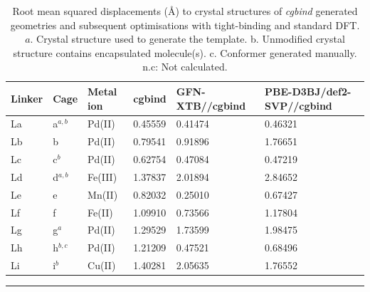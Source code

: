 \documentclass[../../main.tex]{subfiles}
\newcommand{\cgbind}{\emph{cgbind }}
\begin{document}
\begin{table}[h!]
	\def\arraystretch{1.5}
	\begin{tabularx}{\textwidth}{YYYYYY}
		\hline
		Linker&	Cage&	Metal ion&	cgbind&	GFN-XTB//cgbind&PBE-D3BJ/def2-SVP//cgbind\\
		\hline
		La	&a$^{a,b}$&	Pd(II)&	0.45559	&0.41474	&0.46321
\\
		Lb	&b			&	Pd(II)&	0.79541	&0.91896	&1.76651
\\
		Lc	&c$^{b}$&	Pd(II)&	0.62754	&0.47084&	0.47219
\\
		Ld	&d$^{a,b}$&	Fe(III)	&1.37837&	2.01894	&2.84652
\\
		Le&	e		&			Mn(II)&	0.82032	&0.25010&	0.67427
\\
		Lf&	f				&	Fe(II)	&1.09910&	0.73566	&1.17804
\\
		Lg	&g$^{a}$	&	Pd(II)&	1.29529	&1.73599&	1.98475
\\
		Lh	&h$^{b,c}$	&	Pd(II)&	1.21209	&0.47521&	0.68496
\\
		Li&	i$^{b}$			&Cu(II)&	1.40281	&2.05635	&1.76552
\\
		
	\end{tabularx}
	\hrule
	\caption{Root mean squared displacements (\AA) to crystal structures of \cgbind generated geometries and subsequent optimisations with tight-binding and standard DFT. $a.$ Crystal structure used to generate the template. b. Unmodified crystal structure contains encapsulated molecule(s). c. Conformer generated manually. n.c: Not calculated.}
	\label{table::si_cg_1}
\end{table}
\end{document}
